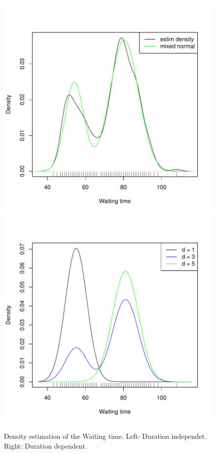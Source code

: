 \documentclass[english,final]{scrartcl}
\begin{document}
\begin{figure}[htbp]
\centering
\includegraphics{Geyser-Analysis-dens_estim}
\hspace{1cm}
\includegraphics{Geyser-Analysis-plot_mn_density2}
\caption{Density estimation of the Waiting time. Left: Duration independet. Right: Duration dependent.}
\label{fig:wait}
\end{figure}
\end{document}
